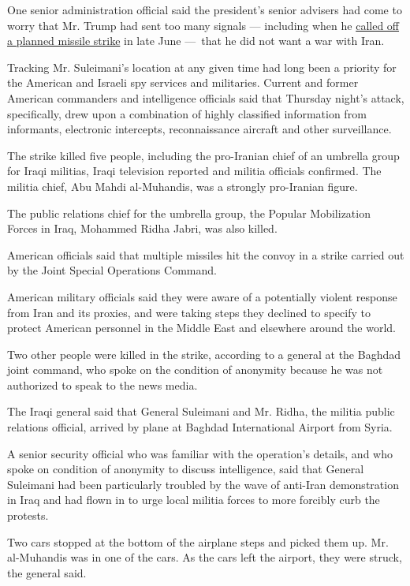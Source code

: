 One senior administration official said the president's senior advisers
had come to worry that Mr. Trump had sent too many signals --- including
when he
\href{https://www.nytimes3xbfgragh.onion/2019/09/21/us/politics/trump-iran-decision.html}{called
off a planned missile strike} in late June ---~that he did not want a
war with Iran.

Tracking Mr. Suleimani's location at any given time had long been a
priority for the American and Israeli spy services and militaries.
Current and former American commanders and intelligence officials said
that Thursday night's attack, specifically, drew upon a combination of
highly classified information from informants, electronic intercepts,
reconnaissance aircraft and other surveillance.

The strike killed five people, including the pro-Iranian chief of an
umbrella group for Iraqi militias, Iraqi television reported and militia
officials confirmed. The militia chief, Abu Mahdi al-Muhandis, was a
strongly pro-Iranian figure.

The public relations chief for the umbrella group, the Popular
Mobilization Forces in Iraq, Mohammed Ridha Jabri, was also killed.

American officials said that multiple missiles hit the convoy in a
strike carried out by the Joint Special Operations Command.

American military officials said they were aware of a potentially
violent response from Iran and its proxies, and were taking steps they
declined to specify to protect American personnel in the Middle East and
elsewhere around the world.

Two other people were killed in the strike, according to a general at
the Baghdad joint command, who spoke on the condition of anonymity
because he was not authorized to speak to the news media.

The Iraqi general said that General Suleimani and Mr. Ridha, the militia
public relations official, arrived by plane at Baghdad International
Airport from Syria.

A senior security official who was familiar with the operation's
details, and who spoke on condition of anonymity to discuss
intelligence, said that General Suleimani had been particularly troubled
by the wave of anti-Iran demonstration in Iraq and had flown in to urge
local militia forces to more forcibly curb the protests.

Two cars stopped at the bottom of the airplane steps and picked them up.
Mr. al-Muhandis was in one of the cars. As the cars left the airport,
they were struck, the general said.

